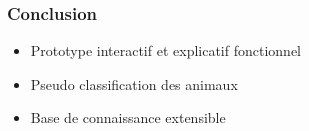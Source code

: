 \documentclass[10pt]{beamer}
\begin{document}
\begin{frame}
	\frametitle{\textbf {\Large Conclusion}}
	
	\begin{itemize}
		
		\item Prototype interactif et explicatif fonctionnel
		\smallskip
		\item Pseudo classification des animaux %
		\smallskip
		\item Base de connaissance extensible %
	\end{itemize}
\end{frame}

\end{document}
